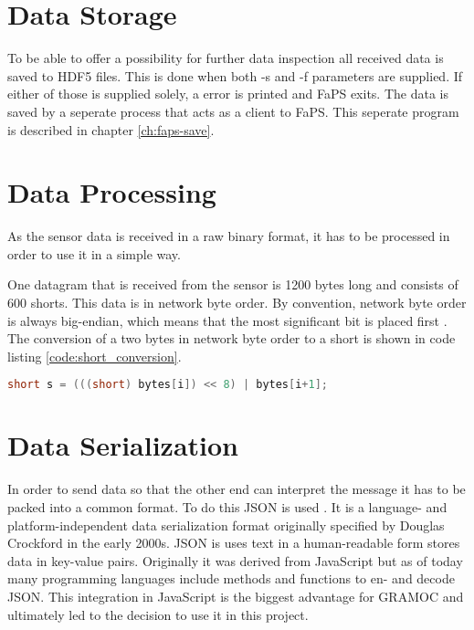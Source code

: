 \section{Data Storage}

To be able to offer a possibility for further data inspection all received data is saved to HDF5 files. This is done when both -s and -f parameters are supplied. If either of those is supplied solely, a error is printed and FaPS exits. The data is saved by a seperate process that acts as a client to FaPS. This seperate program is described in chapter \vref{ch:faps-save}.

\section{Data Processing}


As the sensor data is received in a raw binary format, it has to be processed in order to use it in a simple way.

One datagram that is received from the sensor is 1200 bytes long and consists of 600 shorts. This data is in network byte order. By convention, network byte order is always big-endian, which means that the most significant bit is placed first \autocite{IBMByteOrder}. The conversion of a two bytes in network byte order to a short is shown in code listing \vref{code:short_conversion}.

\begin{minipage}{\textwidth}
\begin{lstlisting}[caption={Conversion of two bytes to a short}, label={code:short_conversion}, captionpos=b, language=C++]
short s = (((short) bytes[i]) << 8) | bytes[i+1];
\end{lstlisting}
\end{minipage}

\section{Data Serialization}

In order to send data so that the other end can interpret the message it has to be packed into a common format. To do this JSON is used \autocite{rfc8259}. It is a language- and platform-independent data serialization format
originally specified by Douglas Crockford in the early 2000s. JSON is uses text in a human-readable form stores data in key-value pairs. Originally it was derived from JavaScript but as of today many programming languages
include methods and functions to en- and decode JSON. This integration in JavaScript is the biggest advantage for GRAMOC and ultimately led to the decision to use it in this project.


